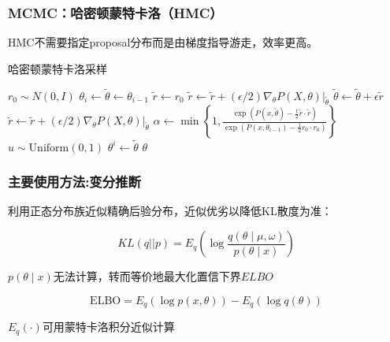 \documentclass{beamer}
\begin{document}
\begin{frame}


\frametitle{MCMC：哈密顿蒙特卡洛（HMC）}

HMC不需要指定proposal分布而是由梯度指导游走，效率更高。

\begin{algorithm}[H]

\tiny

\caption{哈密顿蒙特卡洛采样}
\begin{algorithmic}[1]
 
        \State $r_0 \sim N(0,I)$
        \State $\theta_i \gets \tilde{\theta} \gets \theta_{i-1}$
        \State $\tilde{r} \gets r_0$
         
            \State $\tilde{r} \gets \tilde{r} + (\epsilon/2) \nabla_\theta P(X,\theta)|_{\tilde{\theta}}$
            \State $\tilde{\theta} \gets \tilde{\theta} + \epsilon \tilde{r}$
            \State $\tilde{r} \gets \tilde{r} + (\epsilon/2) \nabla_\theta P(X,\theta)|_{\tilde{\theta}}$
        \EndFor
        \State $\alpha \gets \min \left\{ 1, \frac{\exp(P(x,\tilde{\theta})-\frac{1}{2}\tilde{r}\cdot\tilde{r})}{\exp(P(x,\theta_{i-1})-\frac{1}{2}r_0\cdot r_0)} \right\}$  
        \State $u \sim \mathrm{Uniform}(0,1)$
            \State $\theta^i \gets \tilde{\theta}$
        \EndIf
    \EndFor
    \State \Return $\theta$
\EndProcedure
\end{algorithmic}
\label{alg:hmc}
\end{algorithm}

\end{frame}

\begin{frame}

\frametitle{主要使用方法:变分推断}

利用正态分布族近似精确后验分布，近似优劣以降低KL散度为准：

$$
KL(q||p) = E_q \left( \log \frac{q(\theta \mid \mu,\omega)}{p(\theta \mid x)} \right)
$$

$p(\theta \mid x)$无法计算，转而等价地最大化置信下界$ELBO$

$$
\mathrm{ELBO} = E_q (\log p(x,\theta)) - E_q(\log q(\theta)) 
$$

$E_q(\cdot)$可用蒙特卡洛积分近似计算

\end{frame}
\end{document}
